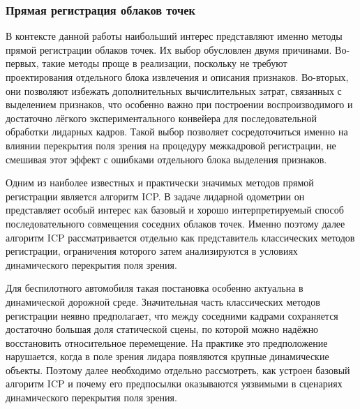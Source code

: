 \subsubsection{Прямая регистрация облаков точек}

В контексте данной работы наибольший интерес представляют именно методы прямой регистрации облаков точек. Их выбор обусловлен двумя причинами. Во-первых, такие методы проще в реализации, поскольку не требуют проектирования отдельного блока извлечения и описания признаков. Во-вторых, они позволяют избежать дополнительных вычислительных затрат, связанных с выделением признаков, что особенно важно при построении воспроизводимого и достаточно лёгкого экспериментального конвейера для последовательной обработки лидарных кадров. Такой выбор позволяет сосредоточиться именно на влиянии перекрытия поля зрения на процедуру межкадровой регистрации, не смешивая этот эффект с ошибками отдельного блока выделения признаков.

Одним из наиболее известных и практически значимых методов прямой регистрации является алгоритм ICP. В задаче лидарной одометрии он представляет особый интерес как базовый и хорошо интерпретируемый способ последовательного совмещения соседних облаков точек. Именно поэтому далее алгоритм ICP рассматривается отдельно как представитель классических методов регистрации, ограничения которого затем анализируются в условиях динамического перекрытия поля зрения.

Для беспилотного автомобиля такая постановка особенно актуальна в динамической дорожной среде. Значительная часть классических методов регистрации неявно предполагает, что между соседними кадрами сохраняется достаточно большая доля статической сцены, по которой можно надёжно восстановить относительное перемещение. На практике это предположение нарушается, когда в поле зрения лидара появляются крупные динамические объекты. Поэтому далее необходимо отдельно рассмотреть, как устроен базовый алгоритм ICP и почему его предпосылки оказываются уязвимыми в сценариях динамического перекрытия поля зрения.
